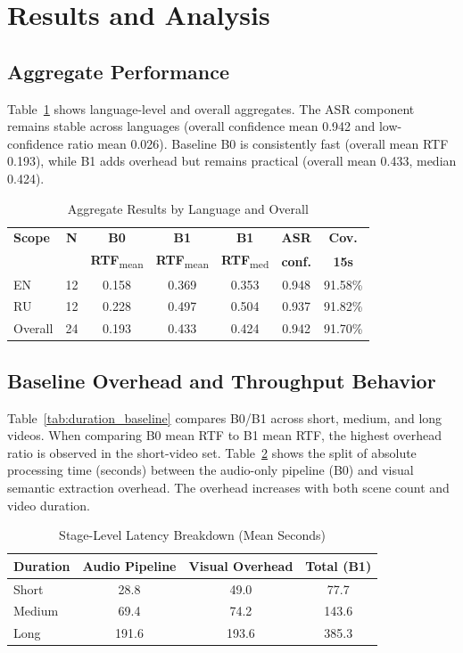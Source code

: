 \documentclass[conference]{IEEEtran}
\begin{document}
\FloatBarrier
\section{Results and Analysis}
\subsection{Aggregate Performance}
Table~\ref{tab:lang_overall} shows language-level and overall aggregates. The ASR component remains stable across languages (overall confidence mean 0.942 and low-confidence ratio mean 0.026). Baseline B0 is consistently fast (overall mean RTF 0.193), while B1 adds overhead but remains practical (overall mean 0.433, median 0.424).

\begin{table}[t]
\caption{Aggregate Results by Language and Overall}
\label{tab:lang_overall}
\centering
\footnotesize
\setlength{\tabcolsep}{4.2pt}
\begin{tabular}{lcccccc}
\toprule
\textbf{Scope} & \textbf{N} & \textbf{B0} & \textbf{B1} & \textbf{B1} & \textbf{ASR} & \textbf{Cov.} \\
 &  & \textbf{RTF}\textsubscript{mean} & \textbf{RTF}\textsubscript{mean} & \textbf{RTF}\textsubscript{med} & \textbf{conf.} & \textbf{15s} \\
\midrule
EN & 12 & 0.158 & 0.369 & 0.353 & 0.948 & 91.58\% \\
RU & 12 & 0.228 & 0.497 & 0.504 & 0.937 & 91.82\% \\
Overall & 24 & 0.193 & 0.433 & 0.424 & 0.942 & 91.70\% \\
\bottomrule
\end{tabular}
\end{table}

\subsection{Baseline Overhead and Throughput Behavior}
Table~\ref{tab:duration_baseline} compares B0/B1 across short, medium, and long videos. When comparing B0 mean RTF to B1 mean RTF, the highest overhead ratio is observed in the short-video set. Table~\ref{tab:stage_latency} shows the split of absolute processing time (seconds) between the audio-only pipeline (B0) and visual semantic extraction overhead. The overhead increases with both scene count and video duration.

\begin{table}[t]
\caption{Stage-Level Latency Breakdown (Mean Seconds)}
\label{tab:stage_latency}
\centering
\footnotesize
\setlength{\tabcolsep}{5pt}
\begin{tabular}{lccc}
\toprule
\textbf{Duration} & \textbf{Audio Pipeline} & \textbf{Visual Overhead} & \textbf{Total (B1)} \\
\midrule
Short & 28.8 & 49.0 & 77.7 \\
Medium & 69.4 & 74.2 & 143.6 \\
Long & 191.6 & 193.6 & 385.3 \\
\bottomrule
\end{tabular}
\end{table}
\end{document}
